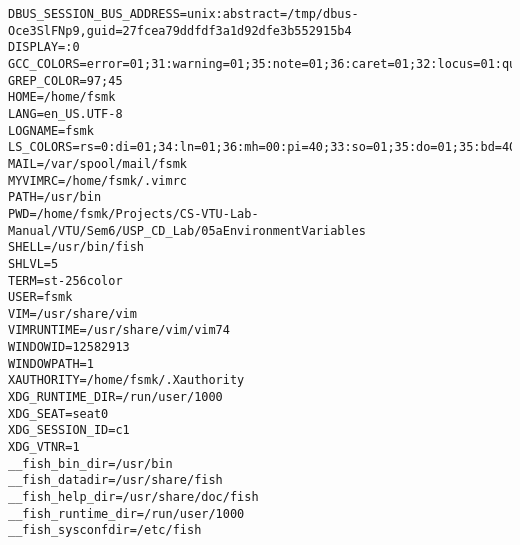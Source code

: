 \begin{lstlisting}[style=shell-output, breakatwhitespace=false]
DBUS_SESSION_BUS_ADDRESS=unix:abstract=/tmp/dbus-Oce3SlFNp9,guid=27fcea79ddfdf3a1d92dfe3b552915b4
DISPLAY=:0
GCC_COLORS=error=01;31:warning=01;35:note=01;36:caret=01;32:locus=01:quote=01
GREP_COLOR=97;45
HOME=/home/fsmk
LANG=en_US.UTF-8
LOGNAME=fsmk
LS_COLORS=rs=0:di=01;34:ln=01;36:mh=00:pi=40;33:so=01;35:do=01;35:bd=40;33;01:cd=40;33;01:or=40;31;01:su=37;41:sg=30;43:ca=30;41:tw=30;42:ow=34;42:st=37;44:ex=01;32:*.tar=01;31:*.tgz=01;31:*.arc=01;31:*.arj=01;31:*.taz=01;31:*.lha=01;31:*.lz4=01;31:*.lzh=01;31:*.lzma=01;31:*.tlz=01;31:*.txz=01;31:*.tzo=01;31:*.t7z=01;31:*.zip=01;31:*.z=01;31:*.Z=01;31:*.dz=01;31:*.gz=01;31:*.lrz=01;31:*.lz=01;31:*.lzo=01;31:*.xz=01;31:*.bz2=01;31:*.bz=01;31:*.tbz=01;31:*.tbz2=01;31:*.tz=01;31:*.deb=01;31:*.rpm=01;31:*.jar=01;31:*.war=01;31:*.ear=01;31:*.sar=01;31:*.rar=01;31:*.alz=01;31:*.ace=01;31:*.zoo=01;31:*.cpio=01;31:*.7z=01;31:*.rz=01;31:*.cab=01;31:*.jpg=01;35:*.jpeg=01;35:*.gif=01;35:*.bmp=01;35:*.pbm=01;35:*.pgm=01;35:*.ppm=01;35:*.tga=01;35:*.xbm=01;35:*.xpm=01;35:*.tif=01;35:*.tiff=01;35:*.png=01;35:*.svg=01;35:*.svgz=01;35:*.mng=01;35:*.pcx=01;35:*.mov=01;35:*.mpg=01;35:*.mpeg=01;35:*.m2v=01;35:*.mkv=01;35:*.webm=01;35:*.ogm=01;35:*.mp4=01;35:*.m4v=01;35:*.mp4v=01;35:*.vob=01;35:*.qt=01;35:*.nuv=01;35:*.wmv=01;35:*.asf=01;35:*.rm=01;35:*.rmvb=01;35:*.flc=01;35:*.avi=01;35:*.fli=01;35:*.flv=01;35:*.gl=01;35:*.dl=01;35:*.xcf=01;35:*.xwd=01;35:*.yuv=01;35:*.cgm=01;35:*.emf=01;35:*.axv=01;35:*.anx=01;35:*.ogv=01;35:*.ogx=01;35:*.aac=00;36:*.au=00;36:*.flac=00;36:*.m4a=00;36:*.mid=00;36:*.midi=00;36:*.mka=00;36:*.mp3=00;36:*.mpc=00;36:*.ogg=00;36:*.ra=00;36:*.wav=00;36:*.axa=00;36:*.oga=00;36:*.spx=00;36:*.xspf=00;36:
MAIL=/var/spool/mail/fsmk
MYVIMRC=/home/fsmk/.vimrc
PATH=/usr/bin
PWD=/home/fsmk/Projects/CS-VTU-Lab-Manual/VTU/Sem6/USP_CD_Lab/05aEnvironmentVariables
SHELL=/usr/bin/fish
SHLVL=5
TERM=st-256color
USER=fsmk
VIM=/usr/share/vim
VIMRUNTIME=/usr/share/vim/vim74
WINDOWID=12582913
WINDOWPATH=1
XAUTHORITY=/home/fsmk/.Xauthority
XDG_RUNTIME_DIR=/run/user/1000
XDG_SEAT=seat0
XDG_SESSION_ID=c1
XDG_VTNR=1
__fish_bin_dir=/usr/bin
__fish_datadir=/usr/share/fish
__fish_help_dir=/usr/share/doc/fish
__fish_runtime_dir=/run/user/1000
__fish_sysconfdir=/etc/fish
\end{lstlisting}
